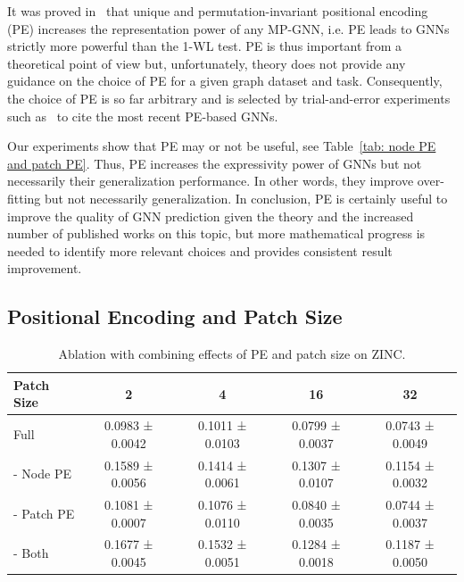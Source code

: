 \documentclass{article}
\begin{document}
It was proved in~\citep{murphy2019relational, Loukas2020What} that unique and permutation-invariant positional encoding (PE) increases the representation power of any MP-GNN, i.e. PE leads to GNNs strictly more powerful than the 1-WL test. PE is thus important from a theoretical point of view but, unfortunately, theory does not provide any guidance on the choice of PE for a given graph dataset and task. Consequently, the choice of PE is so far arbitrary and is selected by trial-and-error experiments such as~\citep{rampavsek2022recipe, lim2022sign} to cite the most recent PE-based GNNs. 

Our experiments show that PE may or not be useful, see Table~\ref{tab: node PE and patch PE}. Thus, PE increases the expressivity power of GNNs but not necessarily their generalization performance. In other words, they improve over-fitting but not necessarily generalization. In conclusion, PE is certainly useful to improve the quality of GNN prediction given the theory and the increased number of published works on this topic, but more mathematical progress is needed to identify more relevant choices and provides consistent result improvement.





\subsection{Positional Encoding and Patch Size}
\begin{table}[!ht]
    \centering
    \small
    \caption{Ablation with combining effects of PE and patch size on ZINC.}
    \label{tab: pe and patch size (zinc)}
    \begin{tabular}{lcccc}    
    \toprule
    Patch Size & 2 & 4 & 16 & 32 
    \\
    \midrule
    Full   
    & 0.0983 ± 0.0042 
    & 0.1011 ± 0.0103
    & 0.0799 ± 0.0037
    & 0.0743 ± 0.0049 
    \\
    
     - Node PE 
    & 0.1589 ± 0.0056
    & 0.1414 ± 0.0061
    & 0.1307 ± 0.0107
    & 0.1154 ± 0.0032 
    \\
     
     - Patch PE
    & 0.1081 ± 0.0007
    & 0.1076 ± 0.0110
    & 0.0840 ± 0.0035
    & 0.0744 ± 0.0037 
    \\
     
     - Both 
    & 0.1677 ± 0.0045
    & 0.1532 ± 0.0051
    & 0.1284 ± 0.0018
    & 0.1187 ± 0.0050 
    \\
     \bottomrule
    \end{tabular}
\end{table}
\end{document}
